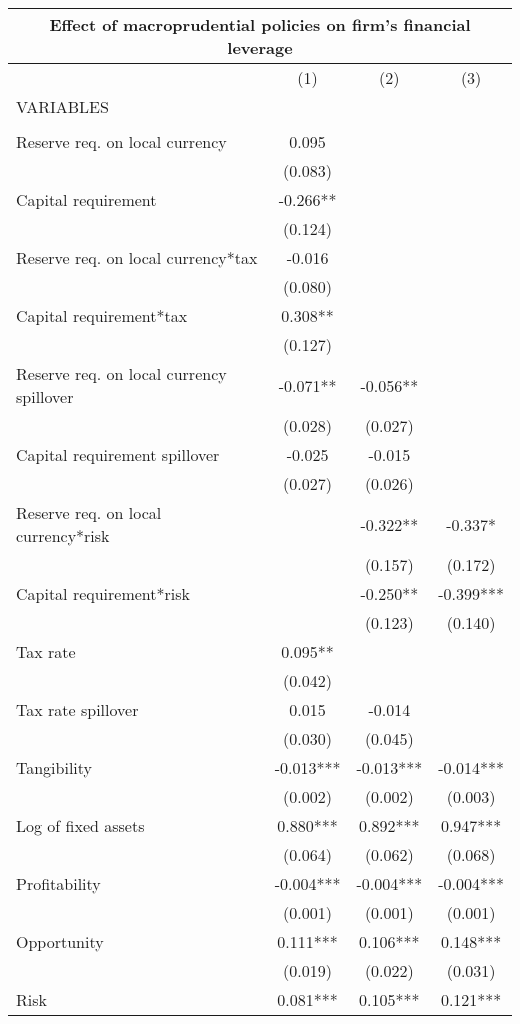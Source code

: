 \begin{tabular}{lccc}
\multicolumn{4}{c}{Effect of macroprudential policies on firm's financial leverage} \\ \hline
 & (1) & (2) & (3) \\
VARIABLES &  &  &  \\ \hline
 &  &  &  \\
Reserve req. on local currency & 0.095 &  &  \\
 & (0.083) &  &  \\
Capital requirement & -0.266** &  &  \\
 & (0.124) &  &  \\
Reserve req. on local currency*tax & -0.016 &  &  \\
 & (0.080) &  &  \\
Capital requirement*tax & 0.308** &  &  \\
 & (0.127) &  &  \\
Reserve req. on local currency spillover & -0.071** & -0.056** &  \\
 & (0.028) & (0.027) &  \\
Capital requirement spillover & -0.025 & -0.015 &  \\
 & (0.027) & (0.026) &  \\
Reserve req. on local currency*risk &  & -0.322** & -0.337* \\
 &  & (0.157) & (0.172) \\
Capital requirement*risk &  & -0.250** & -0.399*** \\
 &  & (0.123) & (0.140) \\
Tax rate & 0.095** &  &  \\
 & (0.042) &  &  \\
Tax rate spillover & 0.015 & -0.014 &  \\
 & (0.030) & (0.045) &  \\
Tangibility & -0.013*** & -0.013*** & -0.014*** \\
 & (0.002) & (0.002) & (0.003) \\
Log of fixed assets & 0.880*** & 0.892*** & 0.947*** \\
 & (0.064) & (0.062) & (0.068) \\
Profitability & -0.004*** & -0.004*** & -0.004*** \\
 & (0.001) & (0.001) & (0.001) \\
Opportunity & 0.111*** & 0.106*** & 0.148*** \\
 & (0.019) & (0.022) & (0.031) \\
Risk & 0.081*** & 0.105*** & 0.121*** \\

\end{tabular}
